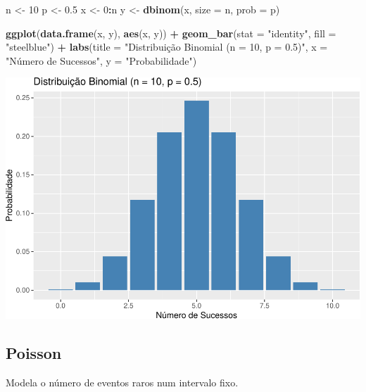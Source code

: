 \documentclass[
]{book}
\newenvironment{Shaded}{\begin{snugshade}}{\end{snugshade}}
\newcommand{\AttributeTok}[1]{\textcolor[rgb]{0.13,0.29,0.53}{#1}}
\newcommand{\DecValTok}[1]{\textcolor[rgb]{0.00,0.00,0.81}{#1}}
\newcommand{\FloatTok}[1]{\textcolor[rgb]{0.00,0.00,0.81}{#1}}
\newcommand{\FunctionTok}[1]{\textcolor[rgb]{0.13,0.29,0.53}{\textbf{#1}}}
\newcommand{\NormalTok}[1]{#1}
\newcommand{\OtherTok}[1]{\textcolor[rgb]{0.56,0.35,0.01}{#1}}
\newcommand{\SpecialCharTok}[1]{\textcolor[rgb]{0.81,0.36,0.00}{\textbf{#1}}}
\newcommand{\StringTok}[1]{\textcolor[rgb]{0.31,0.60,0.02}{#1}}
\begin{document}
\begin{Shaded}
\begin{Highlighting}[]
\NormalTok{n }\OtherTok{\textless{}{-}} \DecValTok{10}
\NormalTok{p }\OtherTok{\textless{}{-}} \FloatTok{0.5}
\NormalTok{x }\OtherTok{\textless{}{-}} \DecValTok{0}\SpecialCharTok{:}\NormalTok{n}
\NormalTok{y }\OtherTok{\textless{}{-}} \FunctionTok{dbinom}\NormalTok{(x, }\AttributeTok{size =}\NormalTok{ n, }\AttributeTok{prob =}\NormalTok{ p)}

\FunctionTok{ggplot}\NormalTok{(}\FunctionTok{data.frame}\NormalTok{(x, y), }\FunctionTok{aes}\NormalTok{(x, y)) }\SpecialCharTok{+}
  \FunctionTok{geom\_bar}\NormalTok{(}\AttributeTok{stat =} \StringTok{"identity"}\NormalTok{, }\AttributeTok{fill =} \StringTok{"steelblue"}\NormalTok{) }\SpecialCharTok{+}
  \FunctionTok{labs}\NormalTok{(}\AttributeTok{title =} \StringTok{"Distribuição Binomial (n = 10, p = 0.5)"}\NormalTok{, }\AttributeTok{x =} \StringTok{"Número de Sucessos"}\NormalTok{, }\AttributeTok{y =} \StringTok{"Probabilidade"}\NormalTok{)}
\end{Highlighting}
\end{Shaded}

\includegraphics{Livro-Estatistica+R_files/figure-latex/binomial-1.pdf}

\subsection{Poisson}\label{poisson}

Modela o número de eventos raros num intervalo fixo.
\end{document}
